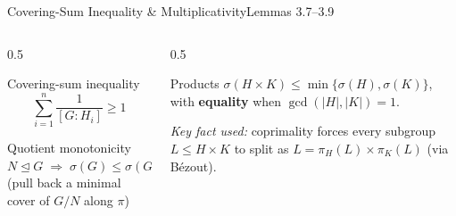 \documentclass[9pt,aspectratio=169]{beamer}
\begin{document}
\begin{frame}{Covering-Sum Inequality \& Multiplicativity}{Lemmas 3.7--3.9}
\begin{columns}[T]
\begin{column}{0.5\textwidth}
\begin{block}{Covering-sum inequality}
\[
\sum_{i=1}^n \frac{1}{[G:H_i]} \ge 1
\]
\end{block}
\begin{exampleblock}{Quotient monotonicity}
$N\trianglelefteq G \;\Rightarrow\; \sigma(G) \le \sigma(G/N)$ \\
\scriptsize (pull back a minimal cover of $G/N$ along $\pi$)
\end{exampleblock}
\end{column}
\begin{column}{0.5\textwidth}
\begin{alertblock}{Products}
$\sigma(H\times K) \le \min\{\sigma(H),\sigma(K)\}$, with \textbf{equality} when $\gcd(|H|,|K|)=1$.
\end{alertblock}
\vspace{2pt}
\scriptsize\textit{Key fact used:} coprimality forces every subgroup $L\le H\times K$ to split as $L = \pi_H(L)\times\pi_K(L)$ (via Bézout).
\end{column}
\end{columns}
\end{frame}
\end{document}
